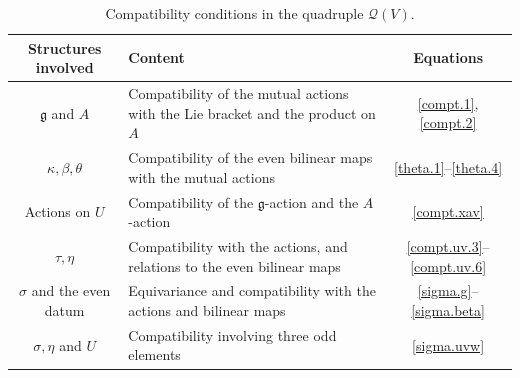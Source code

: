 \documentclass[12pt]{article}
\numberwithin{equation}{section}
\theoremstyle{definition}
\theoremstyle{plain}
\newcommand{\fg}{\mathfrak{g}}
\newcommand{\cQ}{\ensuremath{\mathcal{Q}}}
\begin{document}
\begin{table}[H]
\centering
\small
\linespread{1}\selectfont

\caption{Compatibility conditions in the quadruple $\cQ(V)$.}
\label{tab:compatibility}

\begin{tabularx}{\textwidth}{
    @{}c
    >{\centering\arraybackslash}X
    c@{}
}
\toprule
Structures involved & Content & Equations \\
\midrule

$\fg$ and $A$
& Compatibility of the mutual actions with the Lie bracket
  and the product on $A$
& \eqref{compt.1}, \eqref{compt.2} \\

$\kappa,\beta,\theta$
& Compatibility of the even bilinear maps with the mutual actions
& \eqref{theta.1}--\eqref{theta.4} \\

Actions on $U$
& Compatibility of the $\fg$-action and the $A$-action
& \eqref{compt.xav} \\

$\tau,\eta$
& Compatibility with the actions, and relations to the even bilinear maps
& \eqref{compt.uv.3}--\eqref{compt.uv.6} \\

$\sigma$ and the even datum
& Equivariance and compatibility with the actions and bilinear maps
& \eqref{sigma.g}--\eqref{sigma.beta} \\

$\sigma,\eta$ and $U$
& Compatibility involving three odd elements
& \eqref{sigma.uvw} \\

\bottomrule
\end{tabularx}
\end{table}

\endgroup
\end{document}
